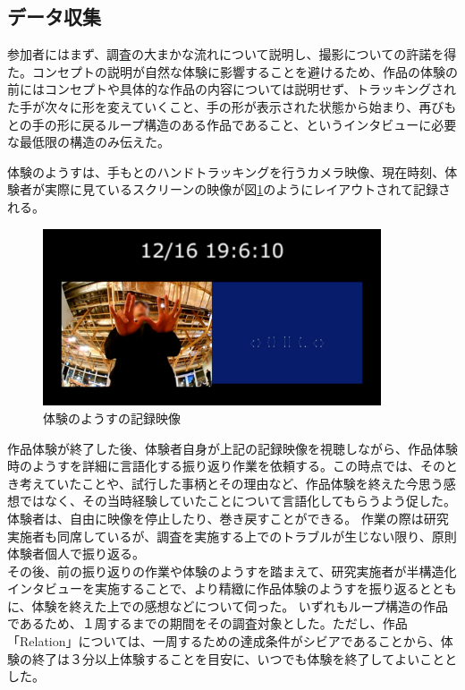 \subsection{データ収集}
参加者にはまず、調査の大まかな流れについて説明し、撮影についての許諾を得た。コンセプトの説明が自然な体験に影響することを避けるため、作品の体験の前にはコンセプトや具体的な作品の内容については説明せず、トラッキングされた手が次々に形を変えていくこと、手の形が表示された状態から始まり、再びもとの手の形に戻るループ構造のある作品であること、というインタビューに必要な最低限の構造のみ伝えた。

体験のようすは、手もとのハンドトラッキングを行うカメラ映像、現在時刻、体験者が実際に見ているスクリーンの映像が図\ref{fig:record_monitor}のようにレイアウトされて記録される。

\begin{figure}[H]
  \centering
  \includegraphics[width=10cm]{img/record_monitor.jpg}
  \caption{体験のようすの記録映像}
  \label{fig:record_monitor}
\end{figure}

作品体験が終了した後、体験者自身が上記の記録映像を視聴しながら、作品体験時のようすを詳細に言語化する振り返り作業を依頼する。この時点では、そのとき考えていたことや、試行した事柄とその理由など、作品体験を終えた今思う感想ではなく、その当時経験していたことについて言語化してもらうよう促した。体験者は、自由に映像を停止したり、巻き戻すことができる。
作業の際は研究実施者も同席しているが、調査を実施する上でのトラブルが生じない限り、原則体験者個人で振り返る。\\
その後、前の振り返りの作業や体験のようすを踏まえて、研究実施者が半構造化インタビューを実施することで、より精緻に作品体験のようすを振り返るとともに、体験を終えた上での感想などについて伺った。
いずれもループ構造の作品であるため、１周するまでの期間をその調査対象とした。ただし、作品「Relation」については、一周するための達成条件がシビアであることから、体験の終了は３分以上体験することを目安に、いつでも体験を終了してよいこととした。


